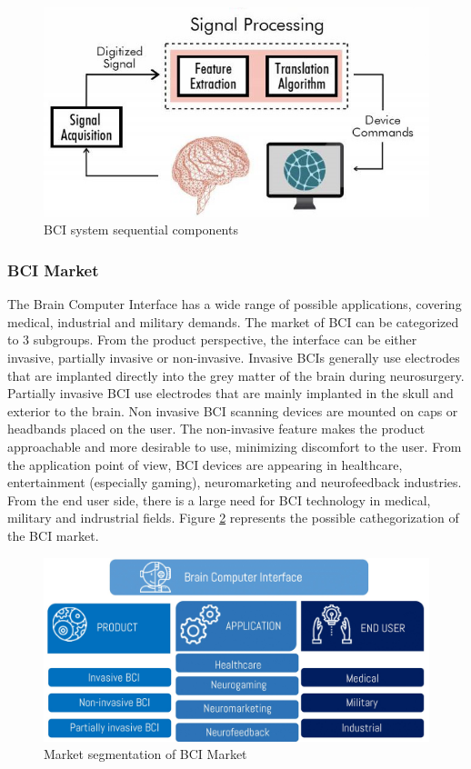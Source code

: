 \documentclass[letterpaper,10pt]{article}
\begin{document}
\begin{figure}[h]
\centering
\includegraphics[scale=0.6]{bci_abra.png}
\caption[BCI system sequential components]{BCI system sequential components \cite{bci_abra}}
\label{fig:bci_abra}
\end{figure}

\subsubsection{BCI Market} 

The Brain Computer Interface has a wide range of possible applications, covering medical, industrial and military demands. The market of BCI can be categorized to 3 subgroups. 
From the product perspective, the interface can be either invasive, partially invasive or non-invasive. 
Invasive BCIs generally use electrodes that are implanted directly into the grey matter of the brain during neurosurgery. Partially invasive BCI use electrodes that are mainly implanted in the skull and exterior to the brain. Non invasive BCI scanning devices are mounted on caps or headbands placed on the user. \cite{kapreans} The non-invasive feature makes the product approachable and more desirable to use, minimizing discomfort to the user. 
From the application point of view, BCI devices are appearing in healthcare, entertainment (especially gaming), neuromarketing and neurofeedback industries. From the end user side, there is a large need for BCI technology in medical, military and indrustrial fields. \cite{bci_fs} Figure \ref{fig:bcimarketsegm} represents the possible cathegorization of the BCI market.

\begin{figure}[h]
\centering
\includegraphics[scale=0.21]{bci.JPG}
\caption[Market segmentation of BCI Market]{Market segmentation of BCI Market \cite{bci_fs}}
\label{fig:bcimarketsegm}
\end{figure}
\end{document}

